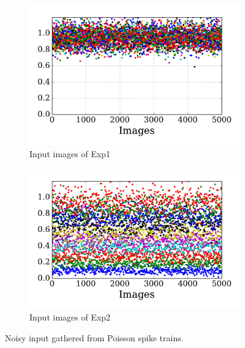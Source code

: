 \begin{figure}
	\centering
	\begin{subfigure}[t]{0.45\textwidth}
		\includegraphics[width=\textwidth]{pics_sdlm/21_exp_AE_noise/exp1.pdf}
		\caption{Input images of Exp1}
	\end{subfigure}
	\begin{subfigure}[t]{0.45\textwidth}
		\includegraphics[width=\textwidth]{pics_sdlm/21_exp_AE_noise/exp2.pdf}
		\caption{Input images of Exp2}
	\end{subfigure}
	\caption{Noisy input gathered from Poisson spike trains.}
	\label{fig:noise_input}
\end{figure}


